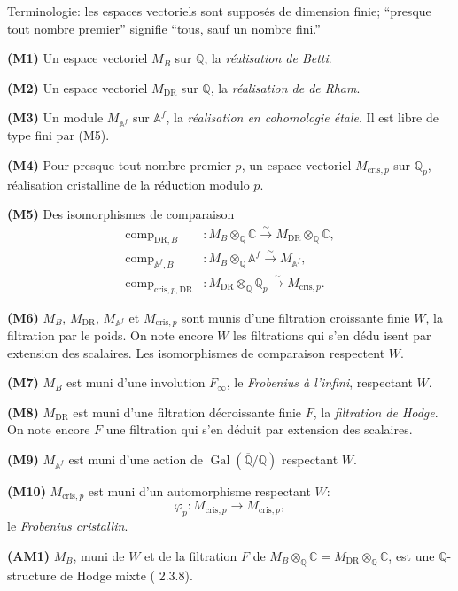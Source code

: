 \documentclass[12pt,a4paper]{article}
\theoremstyle{plain}
\theoremstyle{definition}
\theoremstyle{remark}
\DeclareMathOperator{\Gal}{Gal}
\providecommand{\Gal}{\operatorname{Gal}}
\providecommand{\DR}{\mathrm{DR}}
\providecommand{\cris}{\mathrm{cris}}
\providecommand{\comp}{\operatorname{comp}}
\begin{document}
Terminologie: les espaces vectoriels sont suppos\'es de dimension finie; ``presque tout
nombre premier'' signifie ``tous, sauf un nombre fini.''

\textbf{(M1)} Un espace vectoriel $M_B$ sur $\mathbb{Q}$, la \emph{r\'ealisation de Betti}.

\textbf{(M2)} Un espace vectoriel $M_{\DR}$ sur $\mathbb{Q}$, la \emph{r\'ealisation de de Rham}.

\textbf{(M3)} Un module $M_{\mathbb{A}^f}$ sur $\mathbb{A}^f$, la \emph{r\'ealisation en
cohomologie \'etale}. Il est libre de type fini par (M5).

\textbf{(M4)} Pour presque tout nombre premier $p$, un espace vectoriel $M_{\cris,p}$ sur
$\mathbb{Q}_p$, r\'ealisation cristalline de la r\'eduction modulo $p$.

\textbf{(M5)} Des isomorphismes de comparaison
\begin{align*}
\comp_{\DR,B} &: M_B \otimes_{\mathbb{Q}} \mathbb{C} \xrightarrow{\sim} M_{\DR} \otimes_{\mathbb{Q}} \mathbb{C}, \\
\comp_{\mathbb{A}^f,B} &: M_B \otimes_{\mathbb{Q}} \mathbb{A}^f \xrightarrow{\sim} M_{\mathbb{A}^f}, \\
\comp_{\cris,p,\DR} &: M_{\DR} \otimes_{\mathbb{Q}} \mathbb{Q}_p \xrightarrow{\sim} M_{\cris,p}.
\end{align*}

\textbf{(M6)} $M_B$, $M_{\DR}$, $M_{\mathbb{A}^f}$ et $M_{\cris,p}$ sont munis d'une filtration
croissante finie $W$, la filtration par le poids. On note encore $W$ les filtrations qui
s'en d\'edu isent par extension des scalaires. Les isomorphismes de comparaison respectent $W$.

\textbf{(M7)} $M_B$ est muni d'une involution $F_\infty$, le \emph{Frobenius \`a l'infini},
respectant $W$.

\textbf{(M8)} $M_{\DR}$ est muni d'une filtration d\'ecroissante finie $F$, la \emph{filtration de
Hodge}. On note encore $F$ une filtration qui s'en d\'eduit par extension des scalaires.

\textbf{(M9)} $M_{\mathbb{A}^f}$ est muni d'une action de $\Gal(\overline{\mathbb{Q}}/\mathbb{Q})$
respectant $W$.

\textbf{(M10)} $M_{\cris,p}$ est muni d'un automorphisme respectant $W$:
\[
\varphi_p: M_{\cris,p} \longrightarrow M_{\cris,p},
\]
le \emph{Frobenius cristallin}.

\textbf{(AM1)} $M_B$, muni de $W$ et de la filtration $F$ de
$M_B \otimes_{\mathbb{Q}} \mathbb{C} = M_{\DR} \otimes_{\mathbb{Q}} \mathbb{C}$, est une
$\mathbb{Q}$-structure de Hodge mixte (\cite{D2} 2.3.8).
\end{document}
